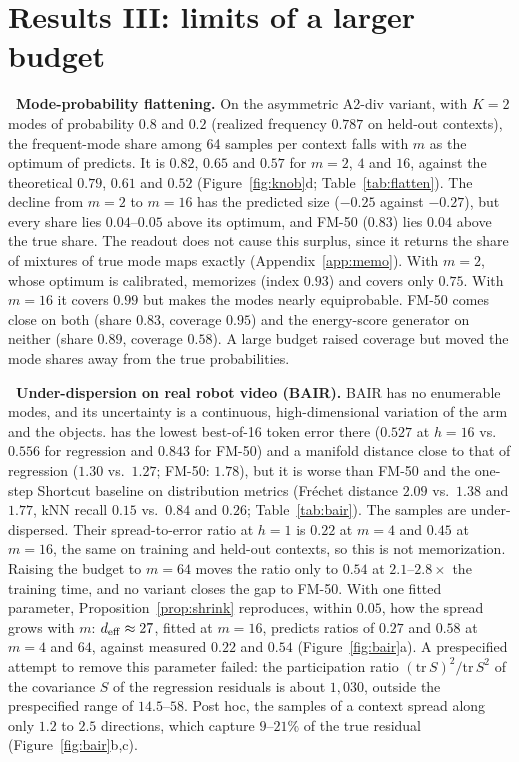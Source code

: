 \section{Results III: limits of a larger budget}
\label{sec:results3}

\leavevmode{}\textbf{\thesubsection\ Mode-probability flattening.}
\label{sec:flatten}
On the asymmetric A2-div variant, with $K{=}2$ modes of probability $0.8$ and $0.2$ (realized frequency $0.787$ on held-out contexts), the frequent-mode share among 64 samples per context falls with $m$ as the optimum of \citet{bennett2026freedom} predicts. It is $0.82$, $0.65$ and $0.57$ for $m = 2$, $4$ and $16$, against the theoretical $0.79$, $0.61$ and $0.52$ (Figure~\ref{fig:knob}d; Table~\ref{tab:flatten}). The decline from $m{=}2$ to $m{=}16$ has the predicted size ($-0.25$ against $-0.27$), but every share lies $0.04$--$0.05$ above its optimum, and FM-50 ($0.83$) lies $0.04$ above the true share. The readout does not cause this surplus, since it returns the share of mixtures of true mode maps exactly (Appendix~\ref{app:memo}). With $m{=}2$, whose optimum is calibrated, \imlewm{} memorizes (index $0.93$) and covers only $0.75$. With $m{=}16$ it covers $0.99$ but makes the modes nearly equiprobable. FM-50 comes close on both (share $0.83$, coverage $0.95$) and the energy-score generator on neither (share $0.89$, coverage $0.58$). A large budget raised coverage but moved the mode shares away from the true probabilities.


\leavevmode{}\textbf{\thesubsection\ Under-dispersion on real robot video (BAIR).}
\label{sec:bair}
BAIR \citep{ebert2017bair} has no enumerable modes, and its uncertainty is a continuous, high-dimensional variation of the arm and the objects. \imlewm{} has the lowest best-of-16 token error there ($0.527$ at $h{=}16$ vs.\ $0.556$ for regression and $0.843$ for FM-50) and a manifold distance close to that of regression ($1.30$ vs.\ $1.27$; FM-50: $1.78$), but it is worse than FM-50 and the one-step Shortcut baseline on distribution metrics (Fr\'echet distance $2.09$ vs.\ $1.38$ and $1.77$, kNN recall $0.15$ vs.\ $0.84$ and $0.26$; Table~\ref{tab:bair}). The samples are under-dispersed. Their spread-to-error ratio at $h{=}1$ is $0.22$ at $m{=}4$ and $0.45$ at $m{=}16$, the same on training and held-out contexts, so this is not memorization. Raising the budget to $m{=}64$ moves the ratio only to $0.54$ at $2.1$--$2.8\times$ the training time, and no \imlewm{} variant closes the gap to FM-50. With one fitted parameter, Proposition~\ref{prop:shrink} reproduces, within $0.05$, how the spread grows with $m$: $d_{\mathrm{eff}} \approx 27$, fitted at $m{=}16$, predicts ratios of $0.27$ and $0.58$ at $m = 4$ and $64$, against measured $0.22$ and $0.54$ (Figure~\ref{fig:bair}a). A prespecified attempt to remove this parameter failed: the participation ratio $(\mathrm{tr}\,S)^2/\mathrm{tr}\,S^2$ of the covariance $S$ of the regression residuals is about $1{,}030$, outside the prespecified range of $14.5$--$58$. Post hoc, the samples of a context spread along only $1.2$ to $2.5$ directions, which capture $9$--$21\%$ of the true residual (Figure~\ref{fig:bair}b,c).
